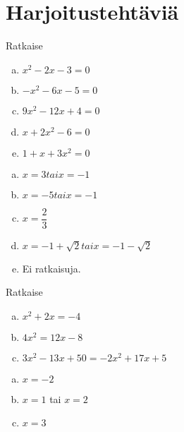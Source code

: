 \section{Harjoitustehtäviä}

\begin{tehtava}
    Ratkaise
    \begin{enumerate}[a)]
        \item $x^2 - 2x - 3 = 0$
        \item $-x^2 - 6x - 5 = 0$
        \item $9x^2 - 12x + 4 = 0$
        \item $x + 2x^2 - 6= 0$
        \item $1 + x + 3x^2= 0$
    \end{enumerate}
    \begin{vastaus}
        \begin{enumerate}[a)]
            \item $x = 3 tai x = -1$
            \item $x = -5 tai x = -1$
            \item $x = \dfrac{2}{3}$
            \item $x = -1 + \sqrt{2} tai x = -1 - \sqrt{2}$
            \item Ei ratkaisuja.
        \end{enumerate}
    \end{vastaus}
\end{tehtava}

\begin{tehtava}
    Ratkaise
    \begin{enumerate}[a)]
        \item $x^2 + 2x = -4$
        \item $4x^2 = 12x - 8$
        \item $3x^2 - 13x + 50 = -2x^2 + 17x + 5$
    \end{enumerate}
    \begin{vastaus}
        \begin{enumerate}[a)]
            \item $x = -2$
            \item $x = 1$ tai $x = 2$
            \item $x = 3$
        \end{enumerate}
    \end{vastaus}
\end{tehtava}

